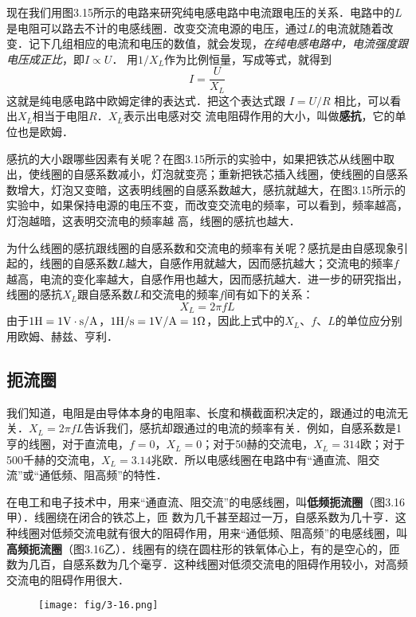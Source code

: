 现在我们用图3.15所示的电路来研究纯电感电路中电流跟电压的关系．电路中的$L$是电阻可以路去不计的电感线圈．改变交流电源的电压，通过$L$的电流就随着改变．记下几组相应的电流和电压的数值，就会发现，\textit{在纯电感电路中，电流强度跟电压成正比}，即$I\propto U$． 用$1/X_L$作为比例恒量，写成等式，就得到
\[I=\frac{U}{X_L} \]
这就是纯电感电路中欧姆定律的表达式．把这个表达式跟
$I=U/R$
相比，可以看出$X_L$相当于电阻$R$．$X_L$表示出电感对交
流电阻碍作用的大小，叫做\textbf{感抗}，它的单位也是欧姆．

感抗的大小跟哪些因素有关呢？在图3.15所示的实验中，如果把铁芯从线圈中取出，使线圈的自感系数减小，灯泡就变亮；重新把铁芯插入线圈，使线圈的自感系数增大，灯泡又变暗，这表明线圈的自感系数越大，感抗就越大，在图3.15所示的实验中，如果保持电源的电压不变，而改变交流电的频率，可以看到，频率越高，灯泡越暗，这表明交流电的频率越	
高，线圈的感抗也越大．

为什么线圈的感抗跟线圈的自感系数和交流电的频率有关呢？感抗是由自感现象引起的，线圈的自感系数$L$越大，自感作用就越大，因而感抗越大；交流电的频率$f$越高，电流的变化率越大，自感作用也越大，因而感抗越大．进一步的研究指出，线圈的感抗$X_L$跟自感系数$L$和交流电的频率$f$间有如下的关系：
\[X_L=2\pi fL\]
由于$1{\rm H}=1{\rm V\cdot s/A}$，$1{\rm H/s}=1{\rm V/A}=1\Omega$，因此上式中的$X_L$、$f$、$L$的单位应分别用欧姆、赫兹、亨利．

\subsection{扼流圈}

我们知道，电阻是由导体本身的电阻率、长度和横截面积决定的，跟通过的电流无关．$X_L=2\pi fL$告诉我们，感抗却跟通过的电流的频率有关．例如，自感系数是1亨的线圈，对于直流电，$f=0$，$X_L=0$；对于50赫的交流电，$X_L=314$欧；对于500千赫的交流电，$X_L=3.14$兆欧．所以电感线圈在电路中有“通直流、阻交流”或“通低频、阻高频”的特性．

在电工和电子技术中，用来“通直流、阻交流”的电感线圈，叫\textbf{低频扼流圈}（图3.16甲）．线圈绕在闭合的铁芯上，匝
数为几千甚至超过一万，自感系数为几十亨．这种线圈对低频交流电就有很大的阻碍作用，用来“通低频、阻高频”的电感线圈，叫\textbf{高频扼流圈}（图3.16乙）．线圈有的绕在圆柱形的铁氧体心上，有的是空心的，匝数为几百，自感系数为几个毫亨．这种线圈对低须交流电的阻碍作用较小，对高频交流电的阻碍作用很大．
\begin{figure}[htp]\centering
\texttt{[image: fig/3-16.png]}
\caption{}
\end{figure}

